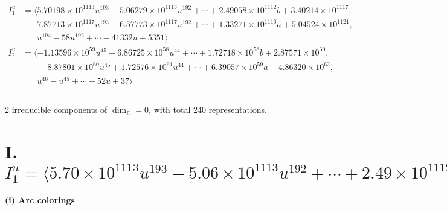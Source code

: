 \documentclass[1p]{elsarticle_modified}
\theoremstyle{definition}
\begin{document}
\begin{align*}
I^u_{1}&=\langle 
5.70198\times10^{1113} u^{193}-5.06279\times10^{1113} u^{192}+\cdots+2.49058\times10^{1112} b+3.40214\times10^{1117},\\
\phantom{I^u_{1}}&\phantom{= \langle  }7.87713\times10^{1117} u^{193}-6.57773\times10^{1117} u^{192}+\cdots+1.33271\times10^{1116} a+5.04524\times10^{1121},\\
\phantom{I^u_{1}}&\phantom{= \langle  }u^{194}-58 u^{192}+\cdots-41332 u+5351\rangle \\
I^u_{2}&=\langle 
-1.13596\times10^{59} u^{45}+6.86725\times10^{58} u^{44}+\cdots+1.72718\times10^{58} b+2.87571\times10^{60},\\
\phantom{I^u_{2}}&\phantom{= \langle  }-8.87801\times10^{60} u^{45}+1.72576\times10^{61} u^{44}+\cdots+6.39057\times10^{59} a-4.86320\times10^{62},\\
\phantom{I^u_{2}}&\phantom{= \langle  }u^{46}- u^{45}+\cdots-52 u+37\rangle \\
\\
\end{align*}
\raggedright * 2 irreducible components of $\dim_{\mathbb{C}}=0$, with total 240 representations.\\
\newpage
\renewcommand{\arraystretch}{1}
\centering \section*{I. $I^u_{1}= \langle 5.70\times10^{1113} u^{193}-5.06\times10^{1113} u^{192}+\cdots+2.49\times10^{1112} b+3.40\times10^{1117},\;7.88\times10^{1117} u^{193}-6.58\times10^{1117} u^{192}+\cdots+1.33\times10^{1116} a+5.05\times10^{1121},\;u^{194}-58 u^{192}+\cdots-41332 u+5351 \rangle$}
\flushleft \textbf{(i) Arc colorings}\\
\end{document}
